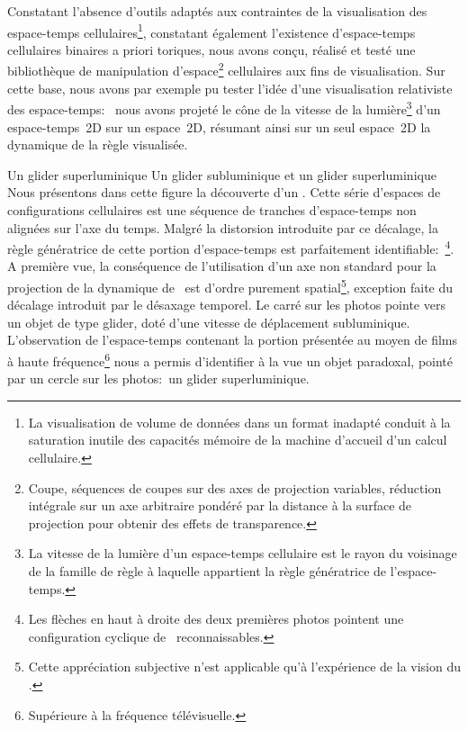 Constatant l'absence d'outils adaptés aux contraintes de la
visualisation des espace-temps cellulaires\footnote{%
  La visualisation de volume de données dans un format inadapté
  conduit à la saturation inutile des capacités mémoire de la machine
  d'accueil d'un calcul cellulaire.}, %
constatant également l'existence d'espace-temps cellulaires binaires a
priori toriques, nous avons conçu, réalisé et testé une bibliothèque
de manipulation d'espace\footnote{%
  Coupe, séquences de coupes sur des axes de projection variables, %
  réduction intégrale sur un axe arbitraire pondéré par la distance à
  la surface de projection pour obtenir des effets de transparence.} %
cellulaires aux fins de visualisation. %
Sur cette base, nous avons par exemple pu tester l'idée d'une
visualisation relativiste des espace-temps:~%
nous avons projeté le cône de la vitesse de la lumière\footnote{%
  La vitesse de la lumière d'un espace-temps cellulaire est le rayon
  du voisinage de la famille de règle à laquelle appartient la règle
  génératrice de l'espace-temps.} %
d'un espace-temps~2D sur un espace~2D, résumant ainsi sur un seul
espace~2D la dynamique de la règle visualisée.

%
{Un glider superluminique}%
{Un glider subluminique et un glider superluminique}%
{Nous présentons dans cette figure la découverte
  d'un . %
  Cette série d'espaces de configurations cellulaires est une séquence
  de tranches d'espace-temps non alignées sur l'axe du temps. %
  Malgré la distorsion introduite par ce décalage, la règle
  génératrice de cette portion d'espace-temps est
  parfaitement identifiable:~\footnote{%
    Les flèches en haut à droite des deux premières photos pointent
    une configuration cyclique de~ reconnaissables.}. %
  A première vue, la conséquence de l'utilisation d'un axe non
  standard pour la projection de la dynamique de~ est
  d'ordre purement spatial\footnote{%
    Cette appréciation subjective n'est applicable qu'à l'expérience
    de la vision du .}, %
  exception faite du décalage introduit par le désaxage temporel. %
  Le carré sur les photos pointe vers un objet  de type
  glider, doté d'une vitesse de déplacement subluminique. %
  L'observation de l'espace-temps contenant la portion présentée au
  moyen de films à haute fréquence\footnote{%
    Supérieure à la fréquence télévisuelle.} %
  nous a permis d'identifier à la vue un objet paradoxal, pointé par
  un cercle sur les photos:~un glider superluminique.}

